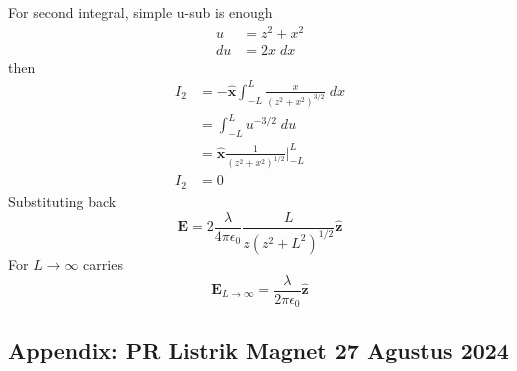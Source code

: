 \documentclass[../../../main.tex]{subfiles}
\begin{document}
For second integral, simple u-sub is enough
\begin{align*}
    u&=z^2+x^2\\
    du&= 2x\;dx
\end{align*}
then\begin{align*}
    I_2&=- \mathbf{\hat{x}} \int_{-L}^{L} \frac{x}{(z^2+x^2)^{3/2}}\;dx\\
    &=\int_{-L}^{L} u^{-3/2}\;du\\
    &=\mathbf{\hat{x}}\frac{1 }{(z^2+x^2)^{1/2}} \bigg|_{-L}^{L}\\
    I_2&=0
\end{align*}
Substituting back
\begin{equation*}
    \mathbf{E}=2 \frac{\lambda}{4\pi\epsilon_0}\frac{L}{z(z^2+L^2)^{1/2}}\mathbf{\hat{z}}
\end{equation*}
For $L\rightarrow\infty$ carries\begin{equation*}
    \mathbf{E}_{L\rightarrow\infty}=\frac{\lambda}{2\pi \epsilon_0}\mathbf{\hat{z}}
\end{equation*}

\subsection{Appendix: PR Listrik Magnet 27 Agustus 2024}
\end{document}
